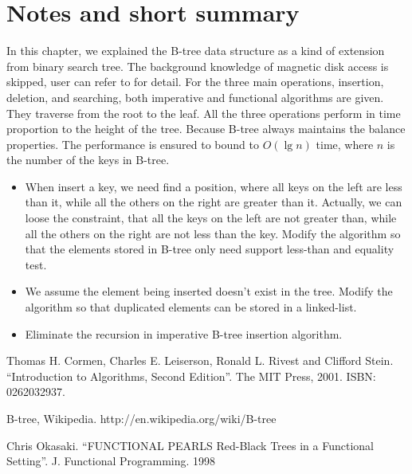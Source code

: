 \documentclass{article}
\begin{document}
\section{Notes and short summary}
In this chapter, we explained the B-tree data structure as a kind of
extension from binary search tree. The background knowledge of
magnetic disk access is skipped, user can refer to \cite{CLRS}
for detail. For the three main operations, insertion, deletion,
and searching, both imperative and functional algorithms are
given. They traverse from the root to the leaf. All the three
operations perform in time proportion to the height of the tree.
Because B-tree always maintains the balance properties. The
performance is ensured to bound to $O(\lg n)$ time,
where $n$ is the number of the keys in B-tree.

\begin{Exercise}
\begin{itemize}
\item When insert a key, we need find a position, where all keys on the left are less than it, while all the others on the right are greater than it. Actually, we can loose the constraint, that all the keys on the left are not greater than, while all the others on the right are not less than the key. Modify the algorithm so that the elements stored in B-tree only need support less-than and equality test.
\item We assume the element being inserted doesn't exist in the tree. Modify the algorithm so that duplicated elements can be stored in a linked-list.
\item Eliminate the recursion in imperative B-tree insertion algorithm.
\end{itemize}
\end{Exercise}

\begin{thebibliography}{99}

Thomas H. Cormen, Charles E. Leiserson, Ronald L. Rivest and Clifford Stein. ``Introduction to Algorithms, Second Edition''. The MIT Press, 2001. ISBN: 0262032937.

B-tree, Wikipedia. http://en.wikipedia.org/wiki/B-tree

Chris Okasaki. ``FUNCTIONAL PEARLS Red-Black Trees in a Functional Setting''. J. Functional Programming. 1998

\end{thebibliography}

\ifx\wholebook\relax \else
\end{document}
